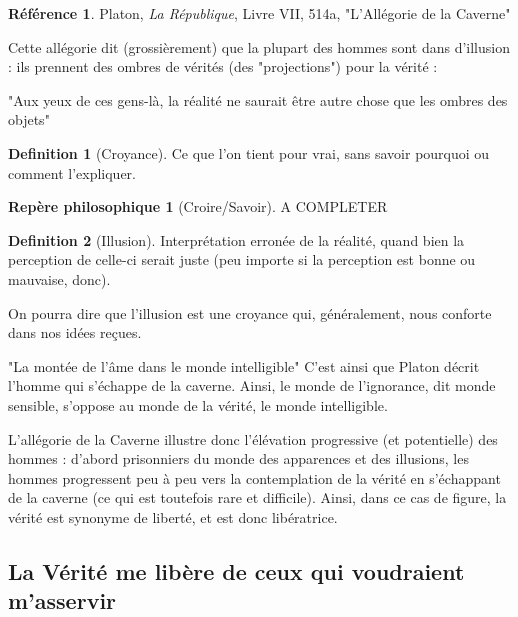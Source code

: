 \documentclass[french]{book}
\theoremstyle{definition}
\newtheorem*{dfn}{Definition}
\newtheorem*{refe}{Référence}
\newtheorem*{rep}{Repère philosophique}
\begin{document}
\begin{refe}
	Platon, \textit{La République}, Livre VII, 514a, "L'Allégorie de la Caverne"
\end{refe}

Cette allégorie dit (grossièrement) que la plupart des hommes sont dans d'illusion : ils prennent des ombres de vérités (des "projections") pour la vérité :

"Aux yeux de ces gens-là, la réalité ne saurait être autre chose que les ombres des objets"

\begin{dfn}[Croyance] 
Ce que l'on tient pour vrai, sans savoir pourquoi ou comment l'expliquer.
\end{dfn}

\begin{rep}[Croire/Savoir]
	A COMPLETER
\end{rep}

\begin{dfn}[Illusion]
Interprétation erronée de la réalité, quand bien la perception de celle-ci serait juste (peu importe si la perception est bonne ou mauvaise, donc).
\end{dfn}


On pourra dire que l'illusion est une croyance qui, généralement, nous conforte dans nos idées reçues.

"La montée de l'âme dans le monde intelligible" 
C'est ainsi que Platon décrit l'homme qui s'échappe de la caverne. Ainsi, le monde de l'ignorance, dit monde sensible, s'oppose au monde de la vérité, le monde intelligible.

L'allégorie de la Caverne illustre donc l'élévation progressive (et potentielle) des hommes : d'abord prisonniers du monde des apparences et des illusions, les hommes progressent peu à peu vers la contemplation de la vérité en s'échappant de la caverne (ce qui est toutefois rare et difficile).
Ainsi, dans ce cas de figure, la vérité est synonyme de liberté, et est donc libératrice.

\subsection{La Vérité me libère de ceux qui voudraient m'asservir}
\end{document}
